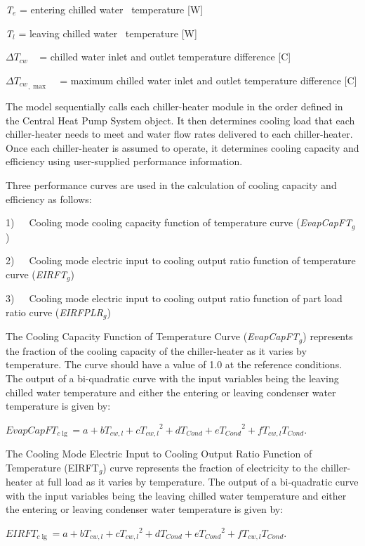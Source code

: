\emph{T\(_{e}\)} = entering chilled water~ temperature {[}W{]}

\emph{T\(_{l}\)} = leaving chilled water~ temperature {[}W{]}

\(\Delta {T_{cw}}\) ~ = chilled water inlet and outlet temperature difference {[}C{]}

\(\Delta {T_{cw}}_{,\max }\) ~ = maximum chilled water inlet and outlet temperature difference {[}C{]}

The model sequentially calls each chiller-heater module in the order defined in the Central Heat Pump System object. It then determines cooling load that each chiller-heater needs to meet and water flow rates delivered to each chiller-heater. Once each chiller-heater is assumed to operate, it determines cooling capacity and efficiency using user-supplied performance information.

Three performance curves are used in the calculation of cooling capacity and efficiency as follows:

1)~~~Cooling mode cooling capacity function of temperature curve (\emph{EvapCapFT\(_{g}\)})

2)~~~Cooling mode electric input to cooling output ratio function of temperature curve (\emph{EIRFT\(_{g}\)})

3)~~~Cooling mode electric input to cooling output ratio function of part load ratio curve (\emph{EIRFPLR\(_{g}\)})

The Cooling Capacity Function of Temperature Curve (\emph{EvapCapFT\(_{g}\)}) represents the fraction of the cooling capacity of the chiller-heater as it varies by temperature. The curve should have a value of 1.0 at the reference conditions. The output of a bi-quadratic curve with the input variables being the leaving chilled water temperature and either the entering or leaving condenser water temperature is given by:

\textbf{\emph{\(EvapCapF{T_{c\lg }} = a + b{T_{cw,l}} + c{T_{cw,l}}^2 + d{T_{Cond}} + e{T_{Cond}}^2 + f{T_{cw,l}}{T_{Cond}}\)}}.

The Cooling Mode Electric Input to Cooling Output Ratio Function of Temperature (EIRFT\(_{g}\)) curve represents the fraction of electricity to the chiller-heater at full load as it varies by temperature. The output of a bi-quadratic curve with the input variables being the leaving chilled water temperature and either the entering or leaving condenser water temperature is given by:

\textbf{\emph{\(EIRF{T_{c\lg }} = a + b{T_{cw,l}} + c{T_{cw,l}}^2 + d{T_{Cond}} + e{T_{Cond}}^2 + f{T_{cw,l}}{T_{Cond}}\)}}.

